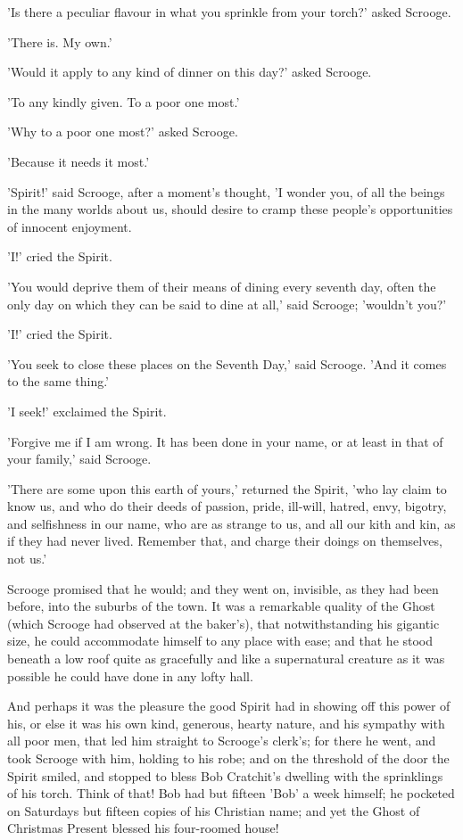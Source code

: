 'Is there a peculiar flavour in what you sprinkle from your torch?'
asked Scrooge.

'There is. My own.'

'Would it apply to any kind of dinner on this day?' asked Scrooge.

'To any kindly given. To a poor one most.'

'Why to a poor one most?' asked Scrooge.

'Because it needs it most.'

'Spirit!' said Scrooge, after a moment's thought, 'I wonder you, of all
the beings in the many worlds about us, should desire to cramp these
people's opportunities of innocent enjoyment.

'I!' cried the Spirit.

'You would deprive them of their means of dining every seventh day,
often the only day on which they can be said to dine at all,' said
Scrooge; 'wouldn't you?'

'I!' cried the Spirit.

'You seek to close these places on the Seventh Day,' said Scrooge. 'And
it comes to the same thing.'

'I seek!' exclaimed the Spirit.

'Forgive me if I am wrong. It has been done in your name, or at least in
that of your family,' said Scrooge.

'There are some upon this earth of yours,' returned the Spirit, 'who
lay claim to know us, and who do their deeds of passion, pride,
ill-will, hatred, envy, bigotry, and selfishness in our name, who are as
strange to us, and all our kith and kin, as if they had never lived.
Remember that, and charge their doings on themselves, not us.'

Scrooge promised that he would; and they went on, invisible, as they had
been before, into the suburbs of the town. It was a remarkable quality
of the Ghost (which Scrooge had observed at the baker's), that
notwithstanding his gigantic size, he could accommodate himself to any
place with ease; and that he stood beneath a low roof quite as
gracefully and like a supernatural creature as it was possible he could
have done in any lofty hall.

And perhaps it was the pleasure the good Spirit had in showing off this
power of his, or else it was his own kind, generous, hearty nature, and
his sympathy with all poor men, that led him straight to Scrooge's
clerk's; for there he went, and took Scrooge with him, holding to his
robe; and on the threshold of the door the Spirit smiled, and stopped to
bless Bob Cratchit's dwelling with the sprinklings of his torch. Think
of that! Bob had but fifteen 'Bob' a week himself; he pocketed on
Saturdays but fifteen copies of his Christian name; and yet the Ghost of
Christmas Present blessed his four-roomed house!

